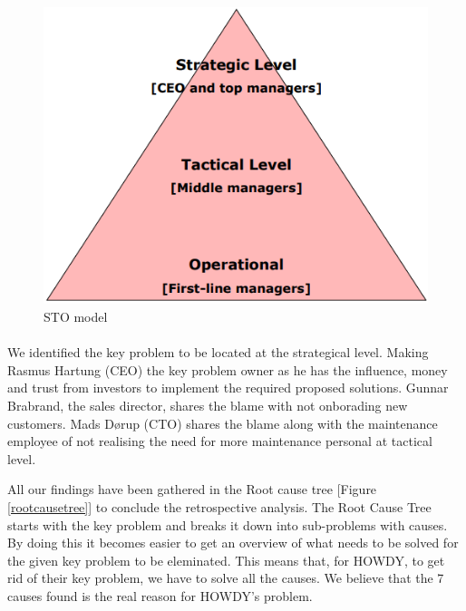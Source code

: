 \begin{figure}
\centering
\includegraphics[scale=0.3]{figures/strategicallevel.png}
\caption{STO model}
\end{figure}
\paragraph{}

We identified the key problem to be located at the strategical level. Making Rasmus Hartung (CEO) the key problem owner as he has the influence, money and trust from investors to implement the required proposed solutions. Gunnar Brabrand, the sales director, shares the blame with not onborading new customers. Mads Dørup (CTO) shares the blame along with the maintenance employee of not realising the need for more maintenance personal at tactical level.\newline


\noindent All our findings have been gathered in the Root cause tree [Figure \ref{rootcausetree}] to conclude the retrospective analysis. The Root Cause Tree starts with the key problem and breaks it down into sub-problems with causes. By doing this it becomes easier to get an overview of what needs to be solved for the given key problem to be eleminated. This means that, for HOWDY, to get rid of their key problem, we have to solve all the causes. We believe that the 7 causes found is the real reason for HOWDY's problem.


